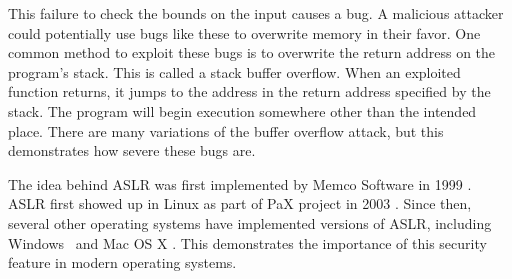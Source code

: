 This failure to check the bounds on the input causes a bug. A malicious attacker could potentially use bugs like these to overwrite memory in their favor. One common method to exploit these bugs is to overwrite the return address on the program’s stack. This is called a stack buffer overflow. When an exploited function returns, it jumps to the address in the return address specified by the stack. The program will begin execution somewhere other than the intended place. There are many variations of the buffer overflow attack, but this demonstrates how severe these bugs are.

The idea behind ASLR was first implemented by Memco Software in 1999 \cite{yarom1999method}. ASLR first showed up in Linux as part of PaX project in 2003 \cite{paxdocs}. Since then, several other operating systems have implemented versions of ASLR, including Windows~\cite{msexploitmitigation} and Mac OS X \cite{applesecurity}. This demonstrates the importance of this security feature in modern operating systems.
